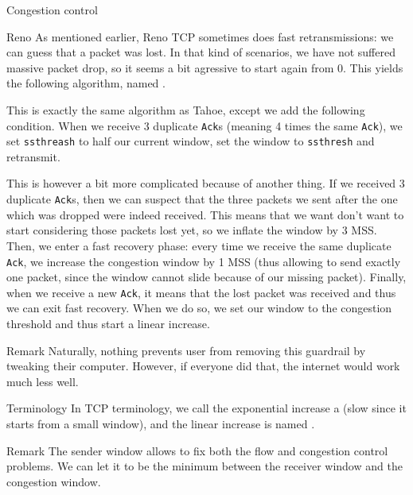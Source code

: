 \documentclass[a4paper]{article}
\begin{document}
\begin{parag}{Congestion control}
    \begin{subparag}{Reno}
        As mentioned earlier, Reno TCP sometimes does fast retransmissions: we can guess that a packet was lost. In that kind of scenarios, we have not suffered massive packet drop, so it seems a bit agressive to start again from 0. This yields the following algorithm, named .

        This is exactly the same algorithm as Tahoe, except we add the following condition. When we receive 3 duplicate \texttt{Ack}s (meaning 4 times the same \texttt{Ack}), we set \texttt{ssthreash} to half our current window, set the window to \texttt{ssthresh} and retransmit.

        This is however a bit more complicated because of another thing. If we received 3 duplicate \texttt{Ack}s, then we can suspect that the three packets we sent after the one which was dropped were indeed received. This means that we want don't want to start considering those packets lost yet, so we inflate the window by 3 MSS. Then, we enter a fast recovery phase: every time we receive the same duplicate \texttt{Ack}, we increase the congestion window by 1 MSS (thus allowing to send exactly one packet, since the window cannot slide because of our missing packet). Finally, when we receive a new \texttt{Ack}, it means that the lost packet was received and thus we can exit fast recovery. When we do so, we set our window to the congestion threshold and thus start a linear increase.
    \end{subparag}
    
    \begin{subparag}{Remark}
        Naturally, nothing prevents user from removing this guardrail by tweaking their computer. However, if everyone did that, the internet would work much less well.
    \end{subparag}
    
    \begin{subparag}{Terminology}
        In TCP terminology, we call the exponential increase a  (slow since it starts from a small window), and the linear increase is named .
    \end{subparag}
    
\end{parag}

\begin{parag}{Remark}
    The sender window allows to fix both the flow and congestion control problems. We can let it to be the minimum between the receiver window and the congestion window.
\end{parag}
\end{document}
